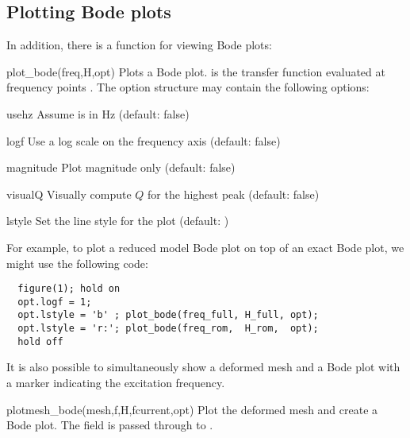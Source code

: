 \subsection{Plotting Bode plots}

In addition, there is a function for viewing Bode plots:
\begin{codelist}

  \item[plot\_bode(freq,H,opt)]
    Plots a Bode plot.   is the transfer function evaluated
    at frequency points .  The option structure 
    may contain the following options:
    \begin{codelist}[magnitude]
    \item[usehz]     Assume  is in Hz (default: false)
    \item[logf]      Use a log scale on the frequency axis (default: false)
    \item[magnitude] Plot magnitude only (default: false)
    \item[visualQ]   Visually compute $Q$ for the highest peak (default: false)
    \item[lstyle]    Set the line style for the plot (default: )
    \end{codelist}
    For example, to plot a reduced model Bode plot on top of an exact
    Bode plot, we might use the following code:
    \begin{verbatim}
  figure(1); hold on
  opt.logf = 1;
  opt.lstyle = 'b' ; plot_bode(freq_full, H_full, opt);
  opt.lstyle = 'r:'; plot_bode(freq_rom,  H_rom,  opt);
  hold off
    \end{verbatim}

\end{codelist}
It is also possible to simultaneously show a deformed mesh and a Bode
plot with a marker indicating the excitation frequency.
\begin{codelist}
  \item[plotmesh\_bode(mesh,f,H,fcurrent,opt)]
    Plot the deformed mesh and create a Bode plot.  The 
    field is passed through to .
\end{codelist}
